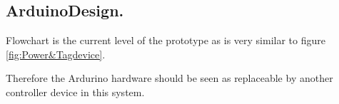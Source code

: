 \subsection{ArduinoDesign.}    

Flowchart is the current level of the prototype as is very similar to figure \ref{fig:Power&Tagdevice}.

Therefore  the Ardurino hardware should be seen as replaceable by another controller device in this system. 